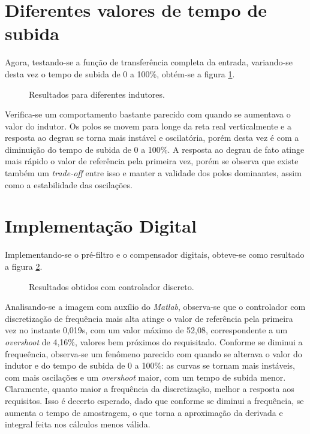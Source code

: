 \documentclass{article}[twocolumn]
\begin{document}
	\section{Diferentes valores de tempo de subida}
	Agora, testando-se a fun\c{c}\~ao de transfer\^encia completa da entrada,
	variando-se desta vez o tempo de subida de 0 a 100\%, obt\'em-se a figura \ref{fig:tr}.
	\begin{figure}[H]
		\centering
		\caption{Resultados para diferentes indutores.}
		\label{fig:tr}
	\end{figure}
	Verifica-se um comportamento bastante parecido com quando se aumentava o valor do indutor.
	Os polos se movem para longe da reta real verticalmente e a resposta ao degrau se torna
	mais inst\'avel e oscilat\'oria, por\'em desta vez \'e com a diminui\c{c}\~ao do tempo
	de subida de 0 a 100\%. A resposta ao degrau de fato atinge mais r\'apido o valor de
	refer\^encia pela primeira vez, por\'em se observa que existe tamb\'em um
	\textit{trade-off} entre isso e manter a validade dos polos dominantes, assim
	como a estabilidade das oscila\c{c}\~oes.
	\section{Implementa\c{c}\~ao Digital}
	Implementando-se o pr\'e-filtro e o compensador digitais, obteve-se como resultado
	a figura \ref{fig:digital}.
	\begin{figure}[H]
		\centering
		\caption{Resultados obtidos com controlador discreto.}
		\label{fig:digital}
	\end{figure}
	Analisando-se a imagem com aux\'ilio do \textit{Matlab}, observa-se que o controlador
	com discretiza\c{c}\~ao de frequ\^encia mais alta atinge o valor de refer\^encia pela
	primeira vez no instante 0,019s, com um valor m\'aximo de 52,08, correspondente a um
	\textit{overshoot} de 4,16\%, valores bem pr\'oximos do requisitado. Conforme se diminui
	a freque\^encia, observa-se um fen\^omeno parecido com quando se alterava o valor
	do indutor e do tempo de subida de 0 a 100\%: as curvas se tornam mais inst\'aveis,
	com mais oscila\c{c}\~oes e um \textit{overshoot} maior, com um tempo de subida menor.
	Claramente, quanto maior a frequ\^encia da discretiza\c{c}\~ao, melhor a resposta
	aos requisitos. Isso \'e decerto esperado, dado que conforme se diminui a frequ\^encia,
	se aumenta o tempo de amostragem, o que torna a aproxima\c{c}\~ao da derivada e integral
	feita nos c\'alculos menos v\'alida.
\end{document}
